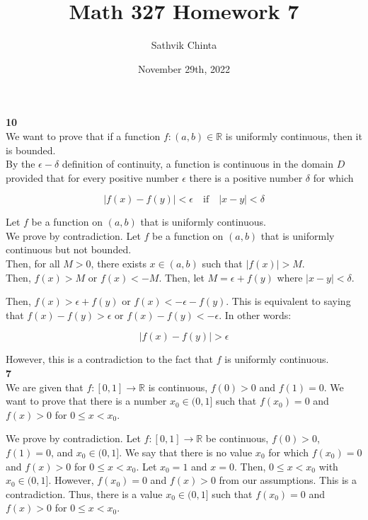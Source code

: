 \documentclass[addpoints]{exam}
\title{Math 327 Homework 7}
\author{Sathvik Chinta}
\date{November 29th, 2022}
\begin{document}
\maketitle

\begin{questions}
\question \textbf{10} \\

We want to prove that if a function $f: (a, b) \in \mathbb{R}$
is uniformly continuous, then it is bounded. \\

By the $\epsilon - \delta$ definition of continuity, 
a function is continuous in the domain $D$ provided that for
every positive number $\epsilon$ there is a positive number
$\delta$ for which 

\[|f(x) - f(y)| < \epsilon \quad \text{if} \quad |x - y| < \delta\]

Let $f$ be a function on $(a, b)$ that is uniformly continuous.\\

We prove by contradiction. Let $f$ be a function on $(a, b)$ that is uniformly continuous but not bounded.\\

Then, for all $M > 0$, there exists $x \in (a, b)$ such that $|f(x)| > M$.\\

Then, $f(x) > M$ or $f(x) < -M$. Then, let $M = \epsilon + f(y)$ where $|x - y| < \delta$.

Then, $f(x) > \epsilon + f(y)$ or $f(x) < -\epsilon - f(y)$. This is equivalent to saying
that $f(x) - f(y) > \epsilon$ or $f(x) - f(y) < -\epsilon$. In other words:

\[|f(x) - f(y)| > \epsilon\]

However, this is a contradiction to the fact that $f$ is uniformly continuous.\\



\question \textbf{7} \\
We are given that $f: [0, 1] \rightarrow \mathbb{R}$ is continuous,
$f(0) > 0$ and $f(1) = 0$. We want to prove that there is a number
$x_0 \in (0, 1]$ such that $f(x_0) = 0$ and $f(x) > 0$ for 
$0 \leq x < x_0$. 

We prove by contradiction. Let $f: [0, 1] \rightarrow \mathbb{R}$ be continuous,
$f(0) > 0$, $f(1) = 0$, and $x_0 \in (0, 1]$. We say that there is no
value $x_0$ for which $f(x_0) = 0$ and $f(x) > 0$ for 
$0 \leq x < x_0$. Let $x_0 = 1$ and $x = 0$. Then, $0 \leq x < x_0$ with
$x_0 \in (0, 1]$. However, $f(x_0) = 0$ and $f(x) > 0$ from our
assumptions. This is a contradiction. Thus, there is a value $x_0 \in (0, 1]$
such that $f(x_0) = 0$ and $f(x) > 0$ for $0 \leq x < x_0$.


\end{questions}
\end{document}
